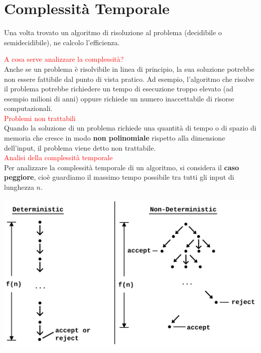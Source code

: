 \documentclass{article}  %
\theoremstyle{definition}
\begin{document}
\section{Complessità Temporale}
Una volta trovato un algoritmo di risoluzione al problema (decidibile o semidecidibile), ne calcolo l'efficienza.
\begin{center}
\end{center}
\textcolor{red}{A cosa serve analizzare la complessità?} \\
Anche se un problema è risolvibile in linea di principio, la sua soluzione potrebbe non essere fattibile dal punto di vista pratico.
Ad esempio, l'algoritmo che risolve il problema potrebbe richiedere un tempo di esecuzione troppo elevato (ad esempio milioni di anni) oppure richiede un numero inaccettabile
di risorse computazionali. \\
\textcolor{red}{Problemi non trattabili} \\
Quando la soluzione di un problema richiede una quantità di tempo o di spazio di memoria che cresce in modo \textbf{non polinomiale} rispetto alla dimensione dell'input, il problema viene
detto non trattabile.\\
\textcolor{red}{Analisi della complessità temporale} \\
Per analizzare la complessità temporale di un algoritmo, si considera il \textbf{caso peggiore}, cioè guardiamo il massimo tempo possibile
tra tutti gli input di lunghezza $n$.
\begin{center}
	\includegraphics[width=0.6\linewidth]{Difference_between_deterministic_and_Nondeterministic.svg.png}
\end{center}
\end{document}
